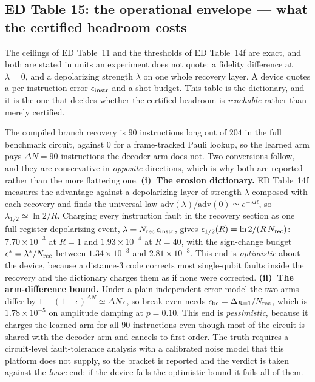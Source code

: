 \documentclass[10pt,a4paper]{article}
\begin{document}
\subsection*{ED Table 15: the operational envelope --- what the certified headroom costs}
The ceilings of ED Table~11 and the thresholds of ED Table~14f are exact, and both
are stated in units an experiment does not quote: a fidelity difference at
$\lambda=0$, and a depolarizing strength $\lambda$ on one whole recovery layer.  A
device quotes a per-instruction error $\epsilon_{\rm instr}$ and a shot budget.
This table is the dictionary, and it is the one that decides whether the certified
headroom is \emph{reachable} rather than merely certified.

The compiled branch recovery is $90$ instructions long out of $204$ in the full
benchmark circuit, against $0$ for a frame-tracked Pauli lookup, so the learned
arm pays $\Delta N=90$ instructions the decoder arm does not.  Two conversions
follow, and they are conservative in \emph{opposite} directions, which is why both
are reported rather than the more flattering one.  \textbf{(i)~The erosion
dictionary.} ED Table~14f measures the advantage against a depolarizing layer of
strength $\lambda$ composed with each recovery and finds the universal law
$\mathrm{adv}(\lambda)/\mathrm{adv}(0)\simeq e^{-\lambda R}$, so
$\lambda_{1/2}\simeq\ln2/R$.  Charging every instruction fault in the recovery
section as one full-register depolarizing event, $\lambda=N_{\rm rec}\,
\epsilon_{\rm instr}$, gives
$\epsilon_{1/2}(R)=\ln2/(R\,N_{\rm rec})$: $7.70\times 10^{-3}$ at $R=1$ and $1.93\times 10^{-4}$ at $R=40$,
with the sign-change budget $\epsilon^*=\lambda^*/N_{\rm rec}$ between $1.34\times 10^{-3}$ and
$2.81\times 10^{-3}$.  This end is \emph{optimistic} about the device, because a distance-$3$
code corrects most single-qubit faults inside the recovery and the dictionary
charges them as if none were corrected.  \textbf{(ii)~The arm-difference bound.}
Under a plain independent-error model the two arms differ by
$1-(1-\epsilon)^{\Delta N}\simeq\Delta N\,\epsilon$, so break-even needs
$\epsilon_{\rm be}=\Delta_{R=1}/N_{\rm rec}$, which is $1.78\times 10^{-5}$ on amplitude damping
at $p=0.10$.  This end is \emph{pessimistic}, because it charges the learned arm
for all $90$ instructions even though most of the circuit is shared with the decoder
arm and cancels to first order.  The truth requires a circuit-level fault-tolerance
analysis with a calibrated noise model that this platform does not supply, so the
bracket is reported and the verdict is taken against the \emph{loose} end: if the
device fails the optimistic bound it fails all of them.
\end{document}
